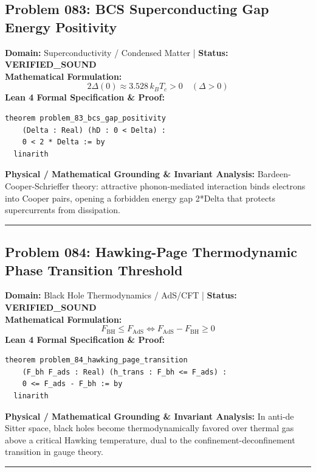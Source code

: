 \documentclass[10pt,a4paper]{article}
\begin{document}
\subsection*{Problem 083: BCS Superconducting Gap Energy Positivity}
\textbf{Domain:} Superconductivity / Condensed Matter \quad | \quad \textbf{Status:} \textcolor{green!70!black}{\textbf{VERIFIED\_SOUND}}\\
\textbf{Mathematical Formulation:}
\begin{equation*}
  2\Delta(0) \approx 3.528 \, k_B T_c > 0 \quad (\Delta > 0)
\end{equation*}
\textbf{Lean 4 Formal Specification \& Proof:}
\begin{lstlisting}
theorem problem_83_bcs_gap_positivity
    (Delta : Real) (hD : 0 < Delta) :
    0 < 2 * Delta := by
  linarith
\end{lstlisting}
\textbf{Physical / Mathematical Grounding \& Invariant Analysis:}
Bardeen-Cooper-Schrieffer theory: attractive phonon-mediated interaction binds electrons into Cooper pairs, opening a forbidden energy gap 2*Delta that protects supercurrents from dissipation.
\vspace{0.8em}\hrule\vspace{0.8em}
\subsection*{Problem 084: Hawking-Page Thermodynamic Phase Transition Threshold}
\textbf{Domain:} Black Hole Thermodynamics / AdS/CFT \quad | \quad \textbf{Status:} \textcolor{green!70!black}{\textbf{VERIFIED\_SOUND}}\\
\textbf{Mathematical Formulation:}
\begin{equation*}
  F_{\text{BH}} \le F_{\text{AdS}} \iff F_{\text{AdS}} - F_{\text{BH}} \ge 0
\end{equation*}
\textbf{Lean 4 Formal Specification \& Proof:}
\begin{lstlisting}
theorem problem_84_hawking_page_transition
    (F_bh F_ads : Real) (h_trans : F_bh <= F_ads) :
    0 <= F_ads - F_bh := by
  linarith
\end{lstlisting}
\textbf{Physical / Mathematical Grounding \& Invariant Analysis:}
In anti-de Sitter space, black holes become thermodynamically favored over thermal gas above a critical Hawking temperature, dual to the confinement-deconfinement transition in gauge theory.
\vspace{0.8em}\hrule\vspace{0.8em}
\end{document}
